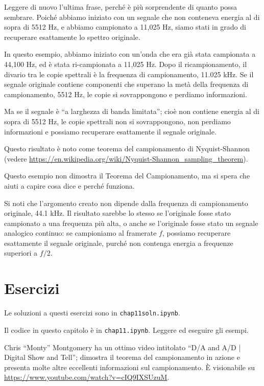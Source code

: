 \documentclass[12pt]{book} \usepackage[width=5.5in,height=8.5in, hmarginratio=3:2,vmarginratio=1:1]{geometry}
\begin{document}
Leggere di nuovo l'ultima frase, perché è più sorprendente di quanto possa sembrare. Poiché abbiamo iniziato con un segnale che non conteneva energia al di sopra di 5512 Hz, e abbiamo campionato a 11,025 Hz, siamo stati in grado di recuperare esattamente lo spettro originale.

In questo esempio, abbiamo iniziato con un'onda che era già stata campionata a 44,100 Hz, ed è stata ri-campionata a 11,025 Hz. Dopo il ricampionamento, il divario tra le copie spettrali è la frequenza di campionamento, 11.025 kHz. Se il segnale originale contiene componenti che superano la metà della frequenza di campionamento, 5512 Hz, le copie si sovrappongono e perdiamo informazioni.

Ma se il segnale è ``a larghezza di banda limitata''; cioè non contiene energia al di sopra di 5512 Hz, le copie spettrali non si sovrappongono, non perdiamo informazioni e possiamo recuperare esattamente il segnale originale.

Questo risultato è noto come teorema del campionamento di Nyquist-Shannon (vedere \url{https://en.wikipedia.org/wiki/Nyquist-Shannon_sampling_theorem}).

Questo esempio non dimostra il Teorema del Campionamento, ma si spera che aiuti a capire cosa dice e perché funziona.

Si noti che l'argomento creato non dipende dalla frequenza di campionamento originale, 44.1 kHz. Il risultato sarebbe lo stesso se l'originale fosse stato campionato a una frequenza più alta, o anche se l'originale fosse stato un segnale analogico continuo: se campioniamo al framerate $f$, possiamo recuperare esattamente il segnale originale, purché non contenga energia a frequenze superiori a $f/2$.

\section{Esercizi} 

Le soluzioni a questi esercizi sono in {\tt chap11soln.ipynb}.

\begin{exercise} Il codice in questo capitolo è in {\tt chap11.ipynb}. Leggere ed eseguire gli esempi. \end{exercise} 

\begin{exercise} Chris ``Monty'' Montgomery ha un ottimo video intitolato ``D/A and A/D | Digital Show and Tell''; dimostra il teorema del campionamento in azione e presenta molte altre eccellenti informazioni sul campionamento. È visionabile su \url{https://www.youtube.com/watch?v=cIQ9IXSUzuM}. \end{exercise} 
\end{document}
